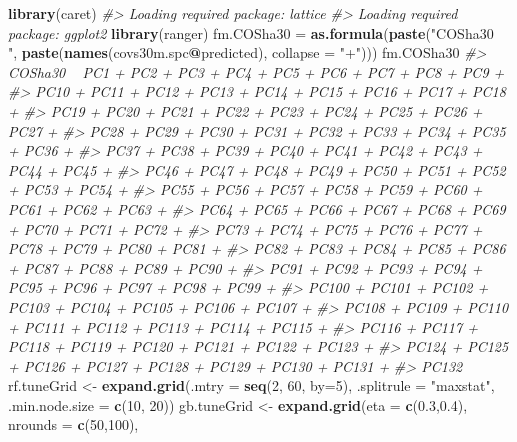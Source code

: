 \documentclass[graybox,natbib,nospthms,UStrade]{svmono}
\newenvironment{Shaded}{\begin{snugshade}}{\end{snugshade}}
\newcommand{\CommentTok}[1]{\textcolor[rgb]{0.37,0.37,0.37}{\textit{#1}}}
\newcommand{\DataTypeTok}[1]{\textcolor[rgb]{0.27,0.27,0.27}{#1}}
\newcommand{\DecValTok}[1]{\textcolor[rgb]{0.06,0.06,0.06}{#1}}
\newcommand{\FloatTok}[1]{\textcolor[rgb]{0.06,0.06,0.06}{#1}}
\newcommand{\KeywordTok}[1]{\textcolor[rgb]{0.27,0.27,0.27}{\textbf{#1}}}
\newcommand{\NormalTok}[1]{#1}
\newcommand{\OperatorTok}[1]{\textcolor[rgb]{0.43,0.43,0.43}{\textbf{#1}}}
\newcommand{\StringTok}[1]{\textcolor[rgb]{0.5,0.5,0.5}{#1}}
\begin{document}
\begin{Shaded}
\begin{Highlighting}[]
\KeywordTok{library}\NormalTok{(caret)}
\CommentTok{#> Loading required package: lattice}
\CommentTok{#> Loading required package: ggplot2}
\KeywordTok{library}\NormalTok{(ranger)}
\NormalTok{fm.COSha30 =}\StringTok{ }\KeywordTok{as.formula}\NormalTok{(}\KeywordTok{paste}\NormalTok{(}\StringTok{"COSha30 ~ "}\NormalTok{,}
                              \KeywordTok{paste}\NormalTok{(}\KeywordTok{names}\NormalTok{(covs30m.spc}\OperatorTok{@}\NormalTok{predicted), }\DataTypeTok{collapse =} \StringTok{"+"}\NormalTok{)))}
\NormalTok{fm.COSha30}
\CommentTok{#> COSha30 ~ PC1 + PC2 + PC3 + PC4 + PC5 + PC6 + PC7 + PC8 + PC9 + }
\CommentTok{#>     PC10 + PC11 + PC12 + PC13 + PC14 + PC15 + PC16 + PC17 + PC18 + }
\CommentTok{#>     PC19 + PC20 + PC21 + PC22 + PC23 + PC24 + PC25 + PC26 + PC27 + }
\CommentTok{#>     PC28 + PC29 + PC30 + PC31 + PC32 + PC33 + PC34 + PC35 + PC36 + }
\CommentTok{#>     PC37 + PC38 + PC39 + PC40 + PC41 + PC42 + PC43 + PC44 + PC45 + }
\CommentTok{#>     PC46 + PC47 + PC48 + PC49 + PC50 + PC51 + PC52 + PC53 + PC54 + }
\CommentTok{#>     PC55 + PC56 + PC57 + PC58 + PC59 + PC60 + PC61 + PC62 + PC63 + }
\CommentTok{#>     PC64 + PC65 + PC66 + PC67 + PC68 + PC69 + PC70 + PC71 + PC72 + }
\CommentTok{#>     PC73 + PC74 + PC75 + PC76 + PC77 + PC78 + PC79 + PC80 + PC81 + }
\CommentTok{#>     PC82 + PC83 + PC84 + PC85 + PC86 + PC87 + PC88 + PC89 + PC90 + }
\CommentTok{#>     PC91 + PC92 + PC93 + PC94 + PC95 + PC96 + PC97 + PC98 + PC99 + }
\CommentTok{#>     PC100 + PC101 + PC102 + PC103 + PC104 + PC105 + PC106 + PC107 + }
\CommentTok{#>     PC108 + PC109 + PC110 + PC111 + PC112 + PC113 + PC114 + PC115 + }
\CommentTok{#>     PC116 + PC117 + PC118 + PC119 + PC120 + PC121 + PC122 + PC123 + }
\CommentTok{#>     PC124 + PC125 + PC126 + PC127 + PC128 + PC129 + PC130 + PC131 + }
\CommentTok{#>     PC132}
\NormalTok{rf.tuneGrid <-}\StringTok{ }\KeywordTok{expand.grid}\NormalTok{(}\DataTypeTok{.mtry =} \KeywordTok{seq}\NormalTok{(}\DecValTok{2}\NormalTok{, }\DecValTok{60}\NormalTok{, }\DataTypeTok{by=}\DecValTok{5}\NormalTok{),}
                           \DataTypeTok{.splitrule =} \StringTok{"maxstat"}\NormalTok{,}
                           \DataTypeTok{.min.node.size =} \KeywordTok{c}\NormalTok{(}\DecValTok{10}\NormalTok{, }\DecValTok{20}\NormalTok{))}
\NormalTok{gb.tuneGrid <-}\StringTok{ }\KeywordTok{expand.grid}\NormalTok{(}\DataTypeTok{eta =} \KeywordTok{c}\NormalTok{(}\FloatTok{0.3}\NormalTok{,}\FloatTok{0.4}\NormalTok{), }
                           \DataTypeTok{nrounds =} \KeywordTok{c}\NormalTok{(}\DecValTok{50}\NormalTok{,}\DecValTok{100}\NormalTok{), }

\end{Highlighting}
\end{Shaded}
\end{document}
